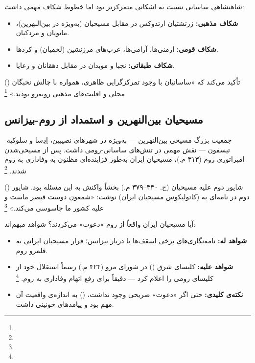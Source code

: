 شاهنشاهی ساسانی نسبت به اشکانی متمرکزتر بود اما خطوط شکاف مهمی داشت:

\begin{itemize}[nosep, rightmargin=1em]
  \item \textbf{شکاف مذهبی:} زرتشتیان ارتدوکس در مقابل مسیحیان (به‌ویژه در بین‌النهرین)، مانویان و مزدکیان.
  \item \textbf{شکاف قومی:} ارمنی‌ها، آرامی‌ها، عرب‌های مرزنشین (لخمیان) و کردها.
  \item \textbf{شکاف طبقاتی:} نجبا و موبدان در مقابل دهقانان و رعایا.
\end{itemize}

 () تأکید می‌کند که «ساسانیان با وجود تمرکزگرایی ظاهری، همواره با چالش نخبگان محلی و اقلیت‌های مذهبی روبه‌رو بودند.»%
\footnote{}

\subsection{مسیحیان بین‌النهرین و استمداد از روم-بیزانس}
\label{subsec:ch04-christians}

جمعیت بزرگ مسیحی بین‌النهرین — به‌ویژه در شهرهای نصیبین، اِدِسا و سلوکیه-تیسفون — نقش مهمی در تنش‌های ساسانی-رومی داشت. پس از مسیحی‌شدن امپراتوری روم (۳۱۳ م.)، مسیحیان ایران به‌طور فزاینده‌ای مظنون به وفاداری به روم شدند.%
\footnote{}

 () شاپور دوم علیه مسیحیان (ح. ۳۴۰–۳۷۹ م.) بخشاً واکنش به این مسئله بود. شاپور دوم در نامه‌ای به  (کاتولیکوس مسیحیان ایران) نوشت: «شمعون دوست قیصر ماست و علیه کشور ما جاسوسی می‌کند.»%
\footnote{}

\begin{tcolorbox}[casebox, title={تحلیل: مسیحیان ساسانی — نجات‌طلبی یا تهمت؟}]
آیا مسیحیان ایران واقعاً از روم «دعوت» می‌کردند؟ شواهد مبهم‌اند:
\begin{itemize}[nosep, rightmargin=1em]
  \item \textbf{شواهد له:} نامه‌نگاری‌های برخی اسقف‌ها با دربار بیزانس؛ فرار مسیحیان ایرانی به قلمرو روم.
  \item \textbf{شواهد علیه:} کلیسای شرق () در شورای مرو (۴۲۴ م.) رسماً استقلال خود از کلیسای رومی را اعلام کرد — دقیقاً برای رفع اتهام وفاداری به روم.%
  \footnote{}
  \item \textbf{نکته‌ی کلیدی:} حتی اگر «دعوت» صریحی وجود نداشت،  () به اندازه‌ی واقعیت آن مهم بود و پیامدهای خونینی داشت.
\end{itemize}
\end{tcolorbox}

